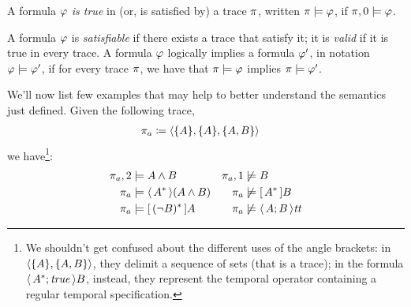\begin{definition}
	A \ldl{} formula $\varphi$ \emph{is true} in (or, is satisfied by) a trace
	$\pi$, written ${\pi \models \varphi}$, if ${\pi, 0 \models
	\varphi}$.
\end{definition}
\begin{definition}
	A \ldl{} formula $\varphi$ is \emph{satisfiable} if there exists a
	trace that satisfy it; it is \emph{valid} if it is true in every trace.
	A formula $\varphi$ logically implies a formula $\varphi'$, in notation 
	${\varphi \models \varphi'}$, if for every trace $\pi$, we have that
	${\pi \models \varphi}$ implies ${\pi \models \varphi'}$.
\end{definition}

\begin{example}
	We'll now list few examples that may help to better understand the semantics
	just defined. Given the following trace,
	\begin{align*}
		\pi_a &\coloneqq \langle \{A\}, \{A\}, \{A, B\} \rangle
	\end{align*}
	we have\footnote{We shouldn't get confused about the different uses of the
	angle brackets: in $\langle \{A\}, \{A, B\} \rangle$, they delimit a
	sequence of sets (that is a trace); in the formula $\langle\, {A^*; \text{\textit{true}}} \,\rangle B$,
	instead, they represent the temporal operator containing a regular temporal
	specification.}:
	\begin{align*}
		\pi_a, 2 &\models A \land B &
		\pi_a, 1 &\not\models B\\
		\pi_a &\models \langle\, {A^*} \,\rangle(A \land B) &
		\pi_a &\not\models [\, {A^*} \,]B \\
		\pi_a &\models [\, {(\neg B)^*} \,]A &
		\pi_a &\not\models \langle\, {A; B} \,\rangle\text{\textit{tt}}
	\end{align*}
\end{example}

